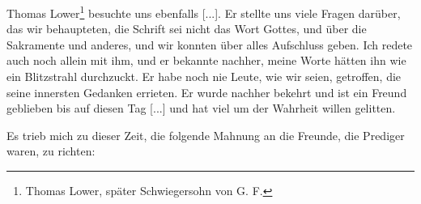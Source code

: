 Thomas Lower\footnote{Thomas Lower, später Schwiegersohn 
von G. F.} besuchte uns 
ebenfalls [...]. Er stellte uns
viele Fragen darüber, das wir behaupteten, die Schrift sei nicht
das Wort Gottes, und über die 
Sakramente und anderes, und
wir konnten über alles Aufschluss geben. Ich redete auch noch
allein mit ihm, und er bekannte nachher, meine Worte hätten
ihn wie ein Blitzstrahl durchzuckt. 
Er habe noch nie Leute, wie
wir seien, getroffen, die seine innersten Gedanken errieten. Er
wurde nachher bekehrt und ist ein Freund geblieben bis auf diesen
Tag [...] und hat viel um der Wahrheit willen gelitten. 


Es trieb 
mich zu dieser Zeit, die folgende Mahnung an die
Freunde, die Prediger waren, zu richten:

